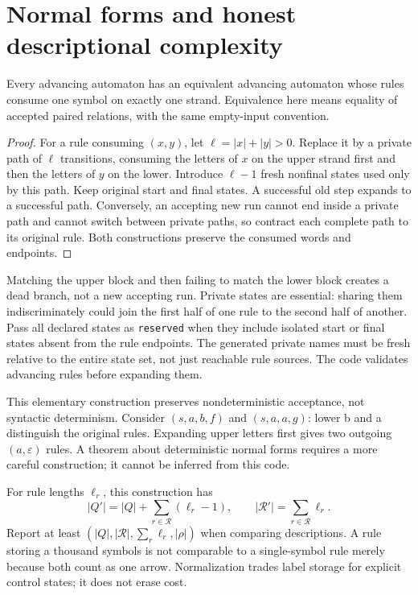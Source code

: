 \section{Normal forms and honest descriptional complexity}
\begin{proposition}
Every advancing automaton has an equivalent advancing automaton whose rules
consume one symbol on exactly one strand. Equivalence here means equality
of accepted paired relations, with the same empty-input convention.
\end{proposition}
\begin{proof}
For a rule consuming $(x,y)$, let $\ell=|x|+|y|>0$. Replace it by a private
path of $\ell$ transitions, consuming the letters of $x$ on the upper
strand first and then the letters of $y$ on the lower. Introduce $\ell-1$
fresh nonfinal states used only by this path. Keep original start and final
states. A successful old step expands to a successful path. Conversely,
an accepting new run cannot end inside a private path and cannot switch
between private paths, so contract each complete path to its original rule.
Both constructions preserve the consumed words and endpoints.
\end{proof}
Matching the upper block and then failing to match the lower block creates
a dead branch, not a new accepting run. Private states are essential: sharing
them indiscriminately could join the first half of one rule to the second
half of another.
Pass all declared states as \texttt{reserved} when they include isolated
start or final states absent from the rule endpoints. The generated private
names must be fresh relative to the entire state set, not just reachable
rule sources. The code validates advancing rules before expanding them.

This elementary construction preserves nondeterministic acceptance, not
syntactic determinism. Consider $(s,a,b,f)$ and $(s,a,a,g)$: lower b and
a distinguish the original rules. Expanding upper letters first gives two
outgoing $(a,\varepsilon)$ rules. A theorem about deterministic normal forms
requires a more careful construction; it cannot be inferred from this code.

For rule lengths $\ell_r$, this construction has
\begin{equation}
 |Q'|=|Q|+\sum_{r\in\mathcal R}(\ell_r-1),\qquad
 |\mathcal R'|=\sum_{r\in\mathcal R}\ell_r.
\end{equation}
Report at least $(|Q|,|\mathcal R|,\sum_r\ell_r,|\rho|)$ when comparing
descriptions. A rule storing a thousand symbols is not comparable to a
single-symbol rule merely because both count as one arrow. Normalization
trades label storage for explicit control states; it does not erase cost.
